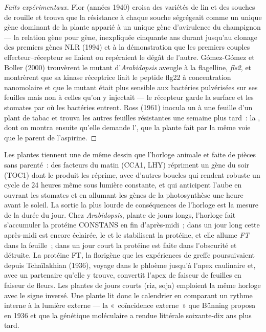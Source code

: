 \begin{proof}[Faits expérimentaux]
Flor (années 1940) croisa des variétés de lin et des souches de rouille
et trouva que la résistance à chaque souche ségrégeait comme un unique
gène dominant de la plante apparié à un unique gène d'avirulence du
champignon --- la relation gène pour gène, inexpliquée cinquante ans
durant jusqu'au clonage des premiers gènes NLR (1994) et à la
démonstration que les premiers couples effecteur--récepteur se liaient
ou repéraient le dégât de l'autre. Gómez-Gómez et Boller (2000)
trouvèrent le mutant d'\emph{Arabidopsis} aveugle à la flagelline,
\emph{fls2}, et montrèrent que sa kinase réceptrice liait le peptide
flg22 à concentration nanomolaire et que le mutant était plus sensible
aux bactéries pulvérisées sur ses feuilles mais non à celles qu'on y
injectait --- le récepteur garde la surface et les stomates par où les
bactéries entrent. Ross (1961) inocula un  à une feuille d'un plant
de tabac et trouva les autres feuilles résistantes une semaine plus
tard~: la , dont on montra ensuite qu'elle
demande l', que la plante fait par la même voie que le
parent de l'aspirine.
\end{proof}

\begin{example}\label{ex:b3:plant-molecular-physiology:clock}
Les plantes tiennent une  de même dessin que
l'horloge animale et faite de pièces sans parenté~: des facteurs du
matin (CCA1, LHY) répriment un gène du soir (TOC1) dont le produit les
réprime, avec d'autres boucles qui rendent robuste un cycle de 24 heures
même sous lumière constante, et qui anticipent l'aube en ouvrant les
stomates et en allumant les gènes de la photosynthèse une heure avant le
soleil. La sortie la plus lourde de conséquences de l'horloge est la
mesure de la durée du jour. Chez \emph{Arabidopsis}, plante de jours
longs, l'horloge fait s'accumuler la protéine CONSTANS en fin
d'après-midi~; dans un jour long cette après-midi est encore éclairée,
le  et le  stabilisent la protéine, et elle
allume \emph{FT} dans la feuille~; dans un jour court la protéine est
faite dans l'obscurité et détruite. La protéine FT, la florigène que les
expériences de greffe poursuivaient depuis Tchaïlakhian (1936), voyage
dans le phloème jusqu'à l'apex caulinaire et, avec un partenaire
qu'elle y trouve, convertit l'apex de faiseur de feuilles en faiseur de
fleurs. Les plantes de jours courts (riz, soja) emploient la même
horloge avec le signe inversé. Une plante lit donc le calendrier en
comparant un rythme interne à la lumière externe --- la «~coïncidence
externe~» que Bünning proposa en 1936 et que la génétique moléculaire a
rendue littérale soixante-dix ans plus tard.
\end{example}

